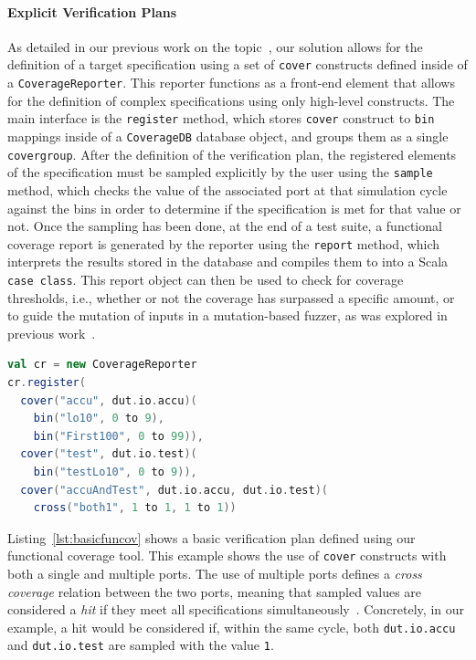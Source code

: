 \documentclass[conference]{IEEEtran}
\begin{document}
\paragraph{Explicit Verification Plans} As detailed in our previous work on the topic~\cite{dobisCoverage:ETS22}, our solution allows for the definition of a target specification using a set of \texttt{cover} constructs defined inside of a \texttt{CoverageReporter}.
This reporter functions as a front-end element that allows for the definition of complex specifications using only high-level constructs.
The main interface is the \texttt{register} method, which stores \texttt{cover} construct to \texttt{bin} mappings inside of a \texttt{CoverageDB} database object, and groups them as a single \texttt{covergroup}.
After the definition of the verification plan, the registered elements of the specification must be sampled explicitly by the user using the \texttt{sample} method, which checks the value of the associated port at that simulation cycle against the bins in order to determine if the specification is met for that value or not.
Once the sampling has been done, at the end of a test suite, a functional coverage report is generated by the reporter using the \texttt{report} method, which interprets the results stored in the database and compiles them to into a Scala \texttt{case class}. 
This report object can then be used to check for coverage thresholds, i.e., whether or not the coverage has surpassed a specific amount, or to guide the mutation of inputs in a mutation-based fuzzer, as was explored in previous work~\cite{verify:fuzzing:2021}.

\begin{lstlisting}[captionpos=b,caption={Small verification plan defined using 3 \texttt{cover} constructs, including one cross coverage construct},label={lst:basicfuncov},language=scala]
val cr = new CoverageReporter
cr.register(
  cover("accu", dut.io.accu)(
    bin("lo10", 0 to 9),
    bin("First100", 0 to 99)),
  cover("test", dut.io.test)(
    bin("testLo10", 0 to 9)),
  cover("accuAndTest", dut.io.accu, dut.io.test)(
    cross("both1", 1 to 1, 1 to 1))
\end{lstlisting}

Listing~\ref{lst:basicfuncov} shows a basic verification plan defined using our functional coverage tool. 
This example shows the use of \texttt{cover} constructs with both a single and multiple ports. 
The use of multiple ports defines a \textit{cross coverage} relation between the two ports, meaning that sampled values are considered a \emph{hit} if they meet all specifications simultaneously~\cite{spear2008systemverilog}.
Concretely, in our example, a hit would be considered if, within the same cycle, both \texttt{dut.io.accu} and \texttt{dut.io.test} are sampled with the value \texttt{1}. 
\end{document}
